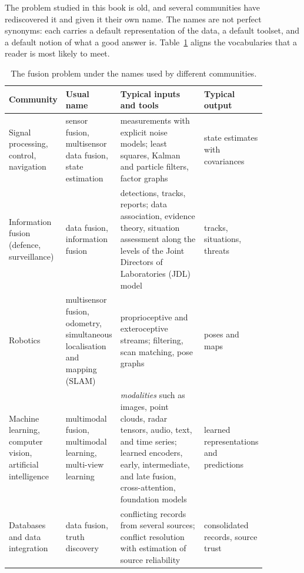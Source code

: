 The problem studied in this book is old, and several communities have rediscovered it and given it their own name. The names are not perfect synonyms: each carries a default representation of the data, a default toolset, and a default notion of what a good answer is. Table~\ref{tab:fusion-terminology} aligns the vocabularies that a reader is most likely to meet.

\begin{table}[!t]
    \centering
    \renewcommand{\arraystretch}{1.25}%
    \footnotesize
    \setlength{\tabcolsep}{4pt}
    \caption{The fusion problem under the names used by different communities.}
    \label{tab:fusion-terminology}
    \begin{tabular}{>{\raggedright\arraybackslash}p{0.17\linewidth} >{\raggedright\arraybackslash}p{0.19\linewidth} >{\raggedright\arraybackslash}p{0.33\linewidth} >{\raggedright\arraybackslash}p{0.18\linewidth}}
        \hline
        \textbf{Community} & \textbf{Usual name} & \textbf{Typical inputs and tools} & \textbf{Typical output} \\
        \hline
        Signal processing, control, navigation & sensor fusion, multisensor data fusion, state estimation & measurements with explicit noise models; least squares, Kalman and particle filters, factor graphs \cite{barshalom2001_estimation,sarkka2013_bayesian} & state estimates with covariances \\
        Information fusion (defence, surveillance) & data fusion, information fusion & detections, tracks, reports; data association, evidence theory, situation assessment along the levels of the Joint Directors of Laboratories (JDL) model \cite{hall_introduction_1997,steinberg1999_jdl,liggins_handbook_2009} & tracks, situations, threats \\
        Robotics & multisensor fusion, odometry, simultaneous localisation and mapping (SLAM) & proprioceptive and exteroceptive streams; filtering, scan matching, pose graphs \cite{thrun_probabilistic_2005} & poses and maps \\
        Machine learning, computer vision, artificial intelligence & multimodal fusion, multimodal learning, multi-view learning & \emph{modalities} such as images, point clouds, radar tensors, audio, text, and time series; learned encoders, early, intermediate, and late fusion, cross-attention, foundation models \cite{atrey_multimodal_2010,baltrusaitis_multimodal_2019,gao_survey_2020} & learned representations and predictions \\
        Databases and data integration & data fusion, truth discovery & conflicting records from several sources; conflict resolution with estimation of source reliability \cite{bleiholder2009_datafusion,li2016_truthdiscovery} & consolidated records, source trust \\
        \hline
    \end{tabular}
\end{table}

